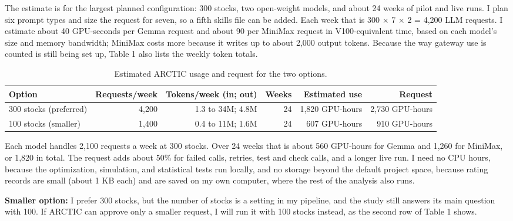 \documentclass[11pt,letterpaper]{article}
\begin{document}
The estimate is for the largest planned configuration: 300 stocks, two open-weight models, and about 24 weeks of pilot and live runs. I plan six prompt types and size the request for seven, so a fifth skills file can be added. Each week that is 300 $\times$ 7 $\times$ 2 = 4,200 LLM requests. I estimate about 40 GPU-seconds per Gemma request and about 90 per MiniMax request in V100-equivalent time, based on each model's size and memory bandwidth; MiniMax costs more because it writes up to about 2,000 output tokens. Because the way gateway use is counted is still being set up, Table 1 also lists the weekly token totals.

\begin{table}[!t]\centering\setlength{\tabcolsep}{5pt}
\caption{Estimated ARCTIC usage and request for the two options.}
\small
\begin{tabular}{lrrrrr}
\toprule
Option & Requests/week & Tokens/week (in; out) & Weeks & Estimated use & Request \\
\midrule
300 stocks (preferred) & 4,200 & 1.3 to 34M; 4.8M & 24 & 1,820 GPU-hours & 2,730 GPU-hours \\
100 stocks (smaller) & 1,400 & 0.4 to 11M; 1.6M & 24 & 607 GPU-hours & 910 GPU-hours \\
\bottomrule
\end{tabular}
\end{table}

Each model handles 2,100 requests a week at 300 stocks. Over 24 weeks that is about 560 GPU-hours for Gemma and 1,260 for MiniMax, or 1,820 in total. The request adds about 50\% for failed calls, retries, test and check calls, and a longer live run. I need no CPU hours, because the optimization, simulation, and statistical tests run locally, and no storage beyond the default project space, because rating records are small (about 1 KB each) and are saved on my own computer, where the rest of the analysis also runs.

\textbf{Smaller option:} I prefer 300 stocks, but the number of stocks is a setting in my pipeline, and the study still answers its main question with 100. If ARCTIC can approve only a smaller request, I will run it with 100 stocks instead, as the second row of Table 1 shows.
\end{document}
